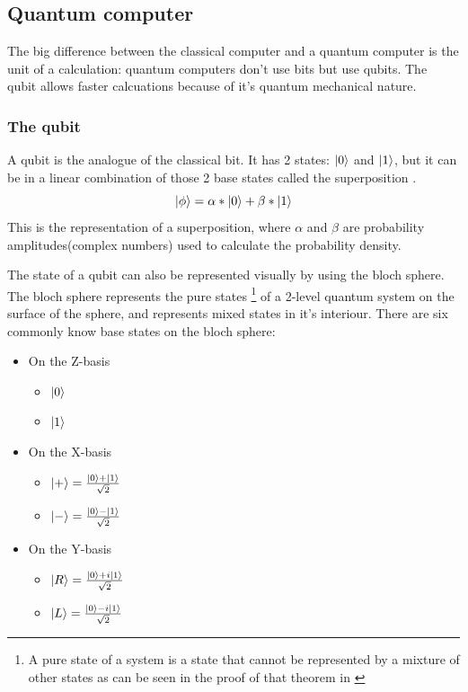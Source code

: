 \subsection{Quantum computer} \label{quantum computer}
The big difference between the classical computer and a quantum computer is the unit of a calculation: quantum computers don't use bits but use qubits.
The qubit allows faster calcuations because of it's quantum mechanical nature.


\subsubsection{The qubit} \label{qubit}
A qubit is the analogue of the classical bit. It has 2 states: $\ket{0}$ and $\ket{1}$, but it can be in a linear combination of those 2 base states called the superposition \autocite{thequbit}.
\begin{equation}
    \ket{\phi} = \alpha * \ket{0} + \beta * \ket{1}
\end{equation}
This is the representation of a superposition, where $\alpha$ and $\beta$ are probability amplitudes(complex numbers) used to calculate the probability density.


The state of a qubit can also be represented visually by using the bloch sphere. The bloch sphere represents the pure states \footnote{A pure state of a system is a state that cannot be represented by a mixture of other states as can be seen in the proof of that theorem in \textcite{Ballentine2014}} of a 2-level quantum system on the surface of the sphere, and represents mixed states in it's interiour.
There are six commonly know base states on the bloch sphere:

\begin{itemize}
    \item On the Z-basis
        \begin{itemize}
            \item $\ket{0}$
            \item $\ket{1}$
        \end{itemize}
    \item On the X-basis
        \begin{itemize}
            \item $\ket{+} = \frac{\ket{0} + \ket{1}}{\sqrt{2}}$
            \item $\ket{-} = \frac{\ket{0} - \ket{1}}{\sqrt{2}}$
        \end{itemize}
    \item On the Y-basis
        \begin{itemize}
            \item $\ket{R} = \frac{\ket{0} + i \ket{1}}{\sqrt{2}}$
            \item $\ket{L} = \frac{\ket{0} - i \ket{1}}{\sqrt{2}}$
        \end{itemize}
\end{itemize}

